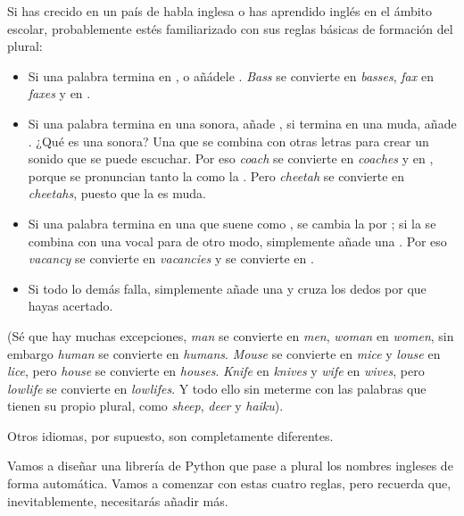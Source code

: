 Si has crecido en un país de habla inglesa o has aprendido inglés en el ámbito escolar, probablemente estés familiarizado con sus reglas básicas de formación del plural:

\begin{itemize}

\item Si una palabra termina en ,  o  añádele . \emph{Bass} se convierte en \emph{basses}, \emph{fax} en \emph{faxes} y  en .

\item Si una palabra termina en una  sonora, añade , si termina en una  muda, añade . ¿Qué es una  sonora? Una que se combina con otras letras para crear un sonido que se puede escuchar. Por eso \emph{coach} se convierte en \emph{coaches} y  en , porque se pronuncian tanto la  como la . Pero \emph{cheetah} se convierte en \emph{cheetahs}, puesto que la  es muda.

\item Si una palabra termina en una  que suene como , se cambia la  por ; si la  se combina con una vocal para de otro modo, simplemente añade una . Por eso \emph{vacancy} se convierte en \emph{vacancies} y  se convierte en .

\item Si todo lo demás falla, simplemente añade una  y cruza los dedos por que hayas acertado.

\end{itemize}

(Sé que hay muchas excepciones, \emph{man} se convierte en \emph{men}, \emph{woman} en \emph{women}, sin embargo \emph{human} se convierte en \emph{humans}. \emph{Mouse} se convierte en \emph{mice} y \emph{louse} en \emph{lice}, pero \emph{house} se convierte en \emph{houses}. \emph{Knife} en \emph{knives} y \emph{wife} en \emph{wives}, pero \emph{lowlife} se convierte en \emph{lowlifes}. Y todo ello sin meterme con las palabras que tienen su propio plural, como \emph{sheep}, \emph{deer} y \emph{haiku}).

Otros idiomas, por supuesto, son completamente diferentes.

Vamos a diseñar una librería de Python que pase a plural los nombres ingleses de forma automática. Vamos a comenzar con estas cuatro reglas, pero recuerda que, inevitablemente, necesitarás añadir más.

